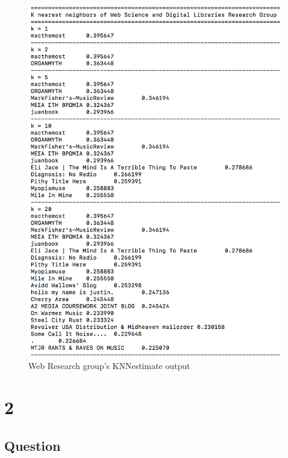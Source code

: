 \documentclass[letterpaper,11pt]{article}
\begin{document}
\clearpage
 \begin{figure}[h]
 \centering
 \includegraphics[scale=0.6]{webknn.png}
 \caption{Web Research group's KNNestimate output}
 \label{fig:q1webknn}
 \end{figure}


\clearpage


\section*{2}

\subsection*{Question}
\end{document}
